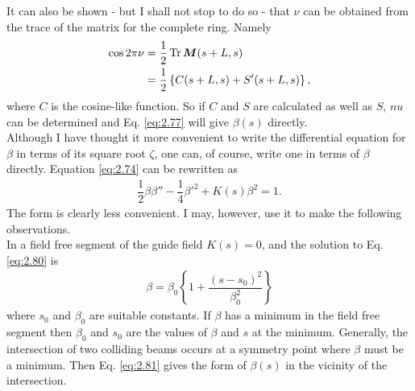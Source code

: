 It can also be shown - but I shall not stop to do so - that $\nu$ can be obtained from the trace of the matrix for the complete ring. Namely
\begin{align}
	\cos2\pi\nu &= \dfrac{1}{2}\operatorname{Tr}\bm{M}(s+L,s) \\
    	&= \dfrac{1}{2}\left\lbrace C(s+L,s)+S'(s+L,s) \right\rbrace,
\end{align}
where $C$ is the cosine-like function. So if $C$ and $S$ are calculated as well as $S$, $nu$ can be determined and Eq. \eqref{eq:2.77} will give $\beta(s)$ directly.\\
Although I have thought it more convenient to write the differential equation for $\beta$ in terms of its square root $\zeta$, one can, of course, write one in terms of $\beta$ directly. Equation \eqref{eq:2.74} can be rewritten as
\begin{align}\label{eq:2.80}
	\dfrac{1}{2}\beta\beta'' - \dfrac{1}{4}\beta'^2 + K(s)\beta^2 = 1.
\end{align}
The form is clearly less convenient. I may, however, use it to make the following observations.\\
In a field free segment of the guide field $K(s) = 0$, and the solution to Eq. \eqref{eq:2.80} is
\begin{align}\label{eq:2.81}
	\beta = \beta_0 \left\lbrace 1 + \dfrac{(s-s_0)^2}{\beta_0^2} \right\rbrace
\end{align}
where $s_0$ and $\beta_0$ are suitable constants. If $\beta$ has a minimum in the field free segment then $\beta_0$ and $s_0$ are the values of $\beta$ and $s$ at the minimum. Generally, the
intersection of two colliding beams occurs at a symmetry point where $\beta$ must be a minimum. Then Eq. \eqref{eq:2.81} gives the form of $\beta(s)$ in the vicinity of the intersection.

